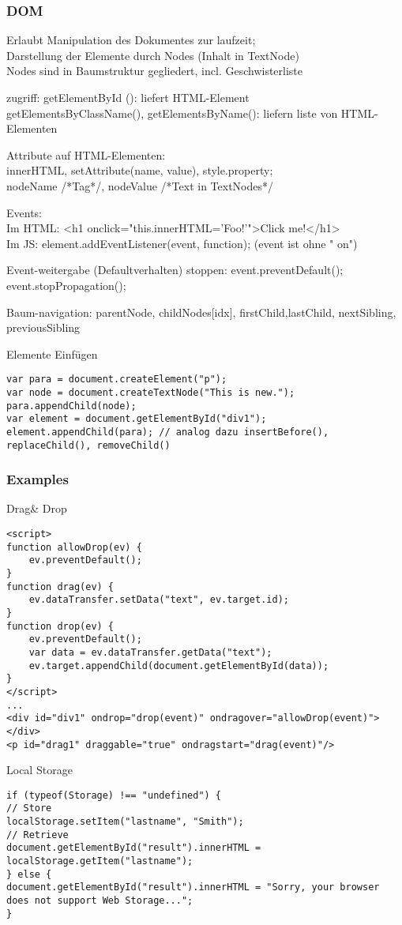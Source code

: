 \subsubsection*{DOM}
Erlaubt Manipulation des Dokumentes zur laufzeit;\\
Darstellung der Elemente durch Nodes (Inhalt in TextNode)\\
Nodes sind in Baumstruktur gegliedert, incl. Geschwisterliste

zugriff:
getElementById (): liefert HTML-Element\\
getElementsByClassName(), getElementsByName(): liefern liste von HTML-Elementen

Attribute auf HTML-Elementen:\\
innerHTML, setAttribute(name, value), style.property;\\
nodeName /*Tag*/, nodeValue /*Text in TextNodes*/

Events: \\
Im HTML: <h1 onclick="this.innerHTML='Foo!'">Click me!</h1>\\
Im JS: element.addEventListener(event, function);    (event ist ohne " on")

Event-weitergabe (Defaultverhalten) stoppen:  
event.preventDefault(); event.stopPropagation();

Baum-navigation: parentNode, childNodes[idx], firstChild,lastChild,
nextSibling, previousSibling

Elemente Einfügen
\begin{verbatim}
var para = document.createElement("p");
var node = document.createTextNode("This is new.");
para.appendChild(node);
var element = document.getElementById("div1");
element.appendChild(para); // analog dazu insertBefore(), replaceChild(), removeChild()
\end{verbatim}


\subsubsection*{Examples}
Drag\& Drop
\begin{verbatim}
<script>
function allowDrop(ev) {
	ev.preventDefault();
}
function drag(ev) {
	ev.dataTransfer.setData("text", ev.target.id);
}
function drop(ev) {
	ev.preventDefault();
	var data = ev.dataTransfer.getData("text");
	ev.target.appendChild(document.getElementById(data));
}
</script>
...
<div id="div1" ondrop="drop(event)" ondragover="allowDrop(event)"></div>
<p id="drag1" draggable="true" ondragstart="drag(event)"/>
\end{verbatim}
Local Storage
\begin{verbatim}
if (typeof(Storage) !== "undefined") {
// Store
localStorage.setItem("lastname", "Smith");
// Retrieve
document.getElementById("result").innerHTML = localStorage.getItem("lastname");
} else {
document.getElementById("result").innerHTML = "Sorry, your browser does not support Web Storage...";
}
\end{verbatim}